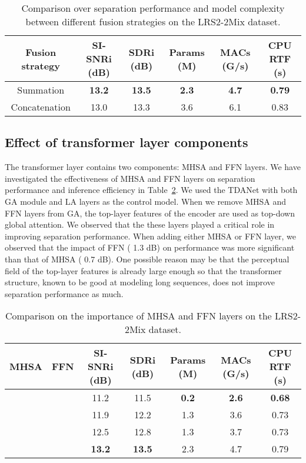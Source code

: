 \documentclass{article} \usepackage{iclr2023_conference,times}
\begin{document}
\begin{table}[ht]
\caption{Comparison over separation performance and model complexity between different fusion strategies on the LRS2-2Mix dataset.}
\label{table:dbc-2}
\begin{center}
\begin{tabular}{cccccc}
\toprule
Fusion strategy & SI-SNRi (dB) & SDRi (dB) & Params (M) & MACs (G/s) & CPU RTF (s) \\
\midrule
Summation       & \bf 13.2         & \bf 13.5      & \bf 2.3        & \bf 4.7        & \bf 0.79        \\
Concatenation   & 13.0         & 13.3      & 3.6        & 6.1        & 0.83      \\
\bottomrule
\end{tabular}
\end{center}
\end{table}

\subsection{Effect of transformer layer components}
\label{sec:a-tl-c}

The transformer layer contains two components: MHSA and FFN layers. We have investigated the effectiveness of MHSA and FFN layers on separation performance and inference efficiency in Table~\ref{table:mse}. We used the TDANet with both GA module and LA layers as the control model. When we remove MHSA and FFN layers from GA, the top-layer features of the encoder are used as top-down global attention. We observed that the these layers played a critical role in improving separation performance. When 
adding either MHSA or FFN layer, we observed that the impact of FFN ( 1.3 dB) on performance was more significant than that of MHSA ( 0.7 dB). One possible reason may be that the perceptual field of the top-layer features is already large enough so that the transformer structure, known to be good at modeling long sequences, does not improve separation performance as much. 


\begin{table}[ht]
\caption{Comparison on the importance of MHSA and FFN layers on the LRS2-2Mix dataset.}
\label{table:mse}
\begin{center}
\begin{tabular}{ccccccc}
\toprule
MHSA & FFN    & SI-SNRi (dB) & SDRi (dB) & Params (M) & MACs (G/s) & CPU RTF (s) \\
\midrule
 &    & 11.2         & 11.5      & \textbf{0.2}        & \textbf{2.6}        & \textbf{0.68}        \\

 &      & 11.9         & 12.2      & 1.3        & 3.6        & 0.73        \\
 &  & 12.5         & 12.8      & 1.3        & 3.7        & 0.73        \\

 &  & \textbf{13.2}         & \textbf{13.5}      & 2.3        & 4.7        & 0.79        \\
\bottomrule
\end{tabular}
\end{center}
\end{table}
\end{document}
